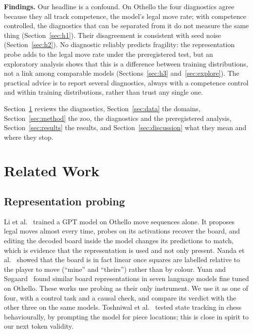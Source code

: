 \documentclass[journal]{IEEEtran}
\begin{document}
\textbf{Findings.} Our headline is a confound. On Othello the four diagnostics agree because they all track
competence, the model's legal move rate; with competence controlled, the diagnostics that can be separated from it
do not measure the same thing (Section~\ref{sec:h1}). Their disagreement is consistent with seed noise
(Section~\ref{sec:h2}). No diagnostic reliably predicts fragility: the representation probe adds to the legal move
rate under the preregistered test, but an exploratory analysis shows that this is a difference between training
distributions, not a link among comparable models (Sections~\ref{sec:h3} and~\ref{sec:explore}). The practical
advice is to report several diagnostics, always with a competence control and within training distributions, rather
than trust any single one.

Section~\ref{sec:related} reviews the diagnostics, Section~\ref{sec:data} the domains, Section~\ref{sec:method} the
zoo, the diagnostics and the preregistered analysis, Section~\ref{sec:results} the results, and
Section~\ref{sec:discussion} what they mean and where they stop.

\section{Related Work}
\label{sec:related}

\subsection{Representation probing}
Li et al.~\cite{li2023othello} trained a GPT model on Othello move sequences alone. It proposes legal moves almost
every time, probes on its activations recover the board, and editing the decoded board inside the model changes its
predictions to match, which is evidence that the representation is used and not only present. Nanda et
al.~\cite{nanda2023emergent} showed that the board is in fact linear once squares are labelled relative to the
player to move (``mine'' and ``theirs'') rather than by colour. Yuan and S{\o}gaard~\cite{yuan2025revisiting} found
similar board representations in seven language models fine tuned on Othello. These works use probing as their only
instrument. We use it as one of four, with a control task and a causal check, and compare its verdict with the other
three on the same models. Toshniwal et al.~\cite{toshniwal2022chess} tested state tracking in chess behaviourally,
by prompting the model for piece locations; this is close in spirit to our next token validity.
\end{document}

